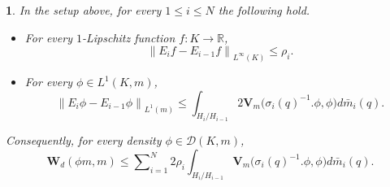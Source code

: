 \documentclass[10pt,a4paper]{amsart}
\newtheorem{lem}{}
\begin{document}
\begin{lem}\label{lem:martcont}
In the setup above, for every \(1\leq i\leq N\) the following hold.
\begin{itemize}
    \item For every \(1\)-Lipschitz function \(f:K\to\mathbb{R}\),
    \[\left\|E_{i}f-E_{i-1}f\right\|_{L^{\infty}\left(K\right)}\leq\rho_{i}.\]
    \item For every \(\phi\in L^{1}\left(K,m\right)\),
    \[\left\|E_{i}\phi-E_{i-1}\phi\right\|_{L^{1}\left(m\right)}\leq\int_{H_{i}/H_{i-1}}2\mathbf{V}_{m}\big(\sigma_{i}\left(q\right)^{-1}.\phi,\phi\big)d\bar{m}_{i}\left(q\right).\]
\end{itemize}
Consequently, for every density \(\phi\in\mathcal{D}\left(K,m\right)\),
\[\mathbf{W}_{d}\left(\phi m,m\right)\leq\sum\nolimits_{i=1}^{N}2\rho_{i}\int_{H_{i}/H_{i-1}}\mathbf{V}_{m}\big(\sigma_{i}\left(q\right)^{-1}.\phi,\phi\big)d\bar{m}_{i}\left(q\right).\]
\end{lem}
\end{document}
